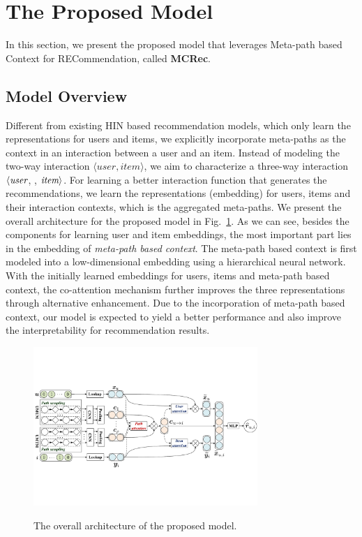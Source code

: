 \section{The Proposed Model}

In this section, we present the proposed  model that leverages  Meta-path based Context for RECommendation, called \textbf{MCRec}.




\subsection{Model Overview}
Different from existing HIN based recommendation models, which only learn the representations for users and items,  we explicitly incorporate meta-paths as the context  in an interaction between a user and an item.
Instead of modeling the two-way interaction $\langle user, item \rangle$, we aim to characterize a three-way interaction
$\langle \emph{user}$, \emph{}, $\emph{item} \rangle$.
For learning a better interaction function that generates the recommendations, we learn the representations (\ie embedding) for users, items and their interaction contexts, which is the aggregated meta-paths.
We present the overall architecture for the proposed model in Fig.~\ref{fig-framework-model}.
As we can see, besides the components for learning user and item embeddings, the most important part lies in the embedding of \emph{meta-path based context}. The meta-path based context is first modeled into a low-dimensional embedding using a hierarchical neural network.
With the initially learned embeddings for users, items and meta-path based context, the co-attention mechanism further improves the three representations through alternative enhancement. Due to the incorporation of  meta-path based context, our model is expected to yield a better performance and also improve the interpretability for recommendation results.

\begin{figure}
  \centering
  \includegraphics[width=8.5cm]{image/framework_model.pdf}\\
  \caption{The overall architecture of the proposed model.}\label{fig-framework-model}
\end{figure}

